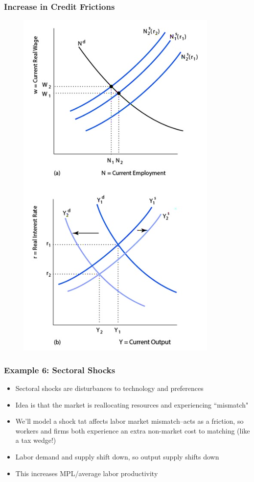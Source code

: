 \documentclass{beamer}
\begin{document}
\begin{frame} 
\frametitle[alignment=center]{Increase in Credit Frictions} 
\begin{figure}
\centering
\includegraphics[scale=0.58]{Figures/W_Fig_11pt29.png}
\end{figure}
\end{frame}

\begin{frame}
\frametitle[alignment=center]{Example 6: Sectoral Shocks} 
\begin{itemize}
\item Sectoral shocks are disturbances to technology and preferences
\bigskip
\item Idea is that the market is reallocating resources and experiencing ``mismatch"
\bigskip
\item We'll model a shock tat affects labor market mismatch--acts as a friction, so workers and firms both experience an extra non-market cost to matching (like a tax wedge!)
\bigskip
\item Labor demand and supply shift down, so output supply shifts down
\bigskip
\item This increases MPL/average labor productivity 
\end{itemize}
\end{frame}
\end{document}
